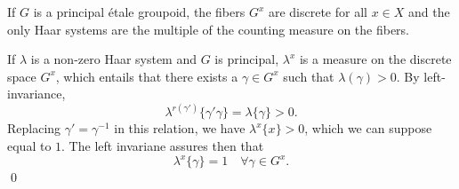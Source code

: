 \begin{prop}
If $G$ is a principal étale groupoid, the fibers $G^x$ are discrete for all $x\in X$ and the only Haar systems are the multiple of the counting measure on the fibers.
\end{prop}
\begin{dem}
If $\lambda$ is a non-zero Haar system and $G$ is principal, $\lambda^x$ is a measure on the discrete space $G^x$, which entails that there exists a $\gamma\in G^x$ such that $\lambda({\gamma})>0$. By left-invariance, 
\[\lambda^{r(\gamma')}\{\gamma'\gamma\}=\lambda\{\gamma\}>0.\]
Replacing $\gamma'=\gamma^{-1}$ in this relation, we have $\lambda^x\{x\}>0$, which we can suppose equal to $1$. The left invariane assures then that
\[\lambda^x\{\gamma\}=1\quad \forall \gamma\in G^x.\]
\qed
\end{dem}